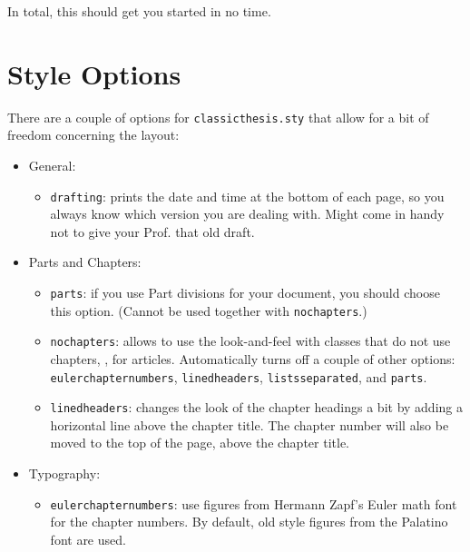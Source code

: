 \noindent In total, this should get you started in no time.


\section{Style Options}\label{sec:options}

There are a couple of options for \texttt{classicthesis.sty} that allow for a bit of freedom concerning the layout: 
\begin{itemize}
\item General:
\begin{itemize}
\item\texttt{drafting}: prints the date and time at the bottom of each page, so you always know which version you are dealing with. Might come in handy not to give your Prof. that old draft.
\end{itemize}
	
\item Parts and Chapters:
\begin{itemize}
\item\texttt{parts}: if you use Part divisions for your document, you should choose this option. (Cannot be used together with \texttt{nochapters}.)

\item\texttt{nochapters}: allows to use the look-and-feel with classes that do not use chapters, \eg, for articles. Automatically turns off a couple of other options: \texttt{eulerchapternumbers}, \texttt{linedheaders}, \texttt{listsseparated}, and \texttt{parts}. 

\item\texttt{linedheaders}: changes the look of the chapter headings a bit by adding a horizontal line above the chapter title. The chapter number will also be moved to the top of the page, above the chapter title.
\end{itemize}

\item Typography:
\begin{itemize}
\item\texttt{eulerchapternumbers}: use figures from Hermann Zapf's Euler math font for the chapter numbers. By default, old style figures from the Palatino font are used.


\end{itemize}
\end{itemize}
